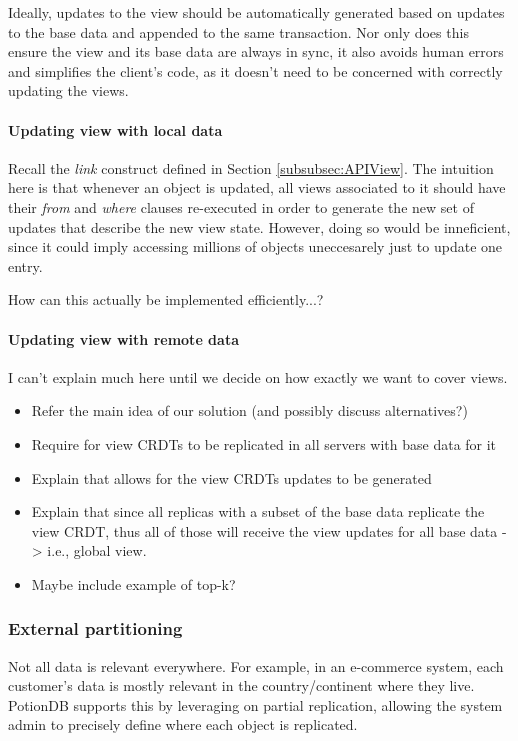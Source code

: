 \documentclass{vldb}
\newcommand{\grumbler}[2]{{\color{red}{\bf #1:} #2}}
\newcommand{\andre}[1]{\grumbler{andre}{#1}}
\begin{document}
Ideally, updates to the view should be automatically generated based on updates to the base data and appended to the same transaction.
Nor only does this ensure the view and its base data are always in sync, it also avoids human errors and simplifies the client's code, as it doesn't need to be concerned with correctly updating the views.

\paragraph{Updating view with local data}
Recall the \emph{link} construct defined in Section \ref{subsubsec:APIView}.
The intuition here is that whenever an object is updated, all views associated to it should have their \emph{from} and \emph{where} clauses re-executed in order to generate the new set of updates that describe the new view state.
However, doing so would be inneficient, since it could imply accessing millions of objects uneccesarely just to update one entry.

\andre{How can this actually be implemented efficiently...?}

\paragraph{Updating view with remote data}

\andre{I can't explain much here until we decide on how exactly we want to cover views.}

\begin{itemize}
	\item Refer the main idea of our solution (and possibly discuss alternatives?)
	\item Require for view CRDTs to be replicated in all servers with base data for it
	\item Explain that allows for the view CRDTs updates to be generated
	\item Explain that since all replicas with a subset of the base data replicate the view CRDT, thus all of those will receive the view updates for all base data -> i.e., global view.
	\item Maybe include example of top-k?
\end{itemize}

\subsubsection{External partitioning}

Not all data is relevant everywhere. 
For example, in an e-commerce system, each customer's data is mostly relevant in the country/continent where they live.
PotionDB supports this by leveraging on partial replication, allowing the system admin to precisely define where each object is replicated.
\end{document}
